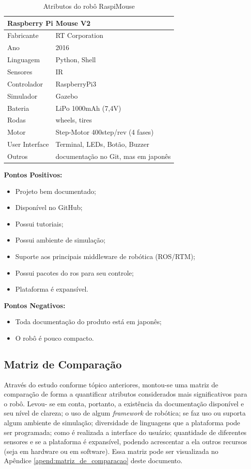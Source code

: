\begin{table}[]
	\centering
	\caption{Atributos do robô RaspiMouse}
	\begin{tabular}{|l|l|}
		\hline
		\multicolumn{2}{|l|}{\textbf{Raspberry Pi Mouse V2}} \\ \hline
		Fabricante & RT Corporation \\ \hline
		Ano & 2016 \\ \hline
		Linguagem & Python, Shell \\ \hline
		Sensores & IR \\ \hline
		Controlador & RaspberryPi3 \\ \hline
		Simulador & Gazebo \\ \hline
		Bateria & LiPo 1000mAh (7,4V) \\ \hline
		Rodas & wheels, tires \\ \hline
		Motor & Step-Motor 400step/rev (4 fases) \\ \hline
		User Interface & Terminal, LEDs, Botão, Buzzer \\ \hline
		Outros & documentação no Git, mas em japonês \\ \hline
	\end{tabular}
	\label{tab:RaspiMouse}
\end{table}

\textbf{Pontos Positivos:}
\begin{itemize}
	\item Projeto bem documentado;
	\item Disponível no GitHub;
	\item Possui tutoriais;
	\item Possui ambiente de simulação;
	\item Suporte aos principais middleware de robótica (ROS/RTM);
	\item Possui pacotes do \gls*{ros} para seu controle;
	\item Plataforma é expansível.
\end{itemize}

\textbf{Pontos Negativos:}
\begin{itemize}
	\item Toda documentação do produto está em japonês;
	\item O robô é pouco compacto.
\end{itemize}

\subsection{Matriz de Comparação}

Através do estudo conforme tópico anteriores, montou-se uma matriz de comparação de forma a
quantificar atributos considerados mais significativos para o robô. Levou- se em conta, portanto, a existência da documentação disponível e seu nível de clareza; o uso de algum \textit{framework} de robótica; se faz uso ou suporta algum ambiente de simulação; diversidade de linguagens que a
plataforma pode ser programada; como é realizada a interface do usuário; quantidade de diferentes sensores e se a plataforma é expansível, podendo acrescentar a ela outros recursos (seja em hardware ou em software). Essa matriz pode ser visualizada no Apêndice \ref{apend:matriz_de_comparacao} deste documento.